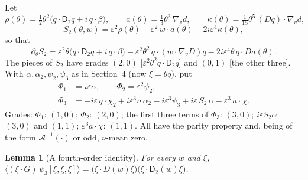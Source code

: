 \documentclass[11pt]{article}
\newcommand{\eps}{\varepsilon}
\newcommand{\cA}{\mathcal{A}}
\newcommand{\sD}{\mathsf{D}}
\newcommand{\avg}[1]{\langle #1\rangle}
\newtheorem{lemma}[theorem]{Lemma}
\theoremstyle{remark}
\begin{document}
Let
\begin{equation}
  \rho(\theta) = \tfrac12\theta^2\bigl(q\cdot\sD_2q + i\,q\cdot\beta\bigr),\qquad
  a(\theta) = \tfrac13\theta^3\,\nabla_vd,\qquad
  \kappa(\theta) = \tfrac1{15}\theta^5\,(Dq)\cdot\nabla_vd,
\end{equation}
\begin{equation}
  S_2(\theta,w) = \eps^2\rho(\theta) - \eps^2\,w\cdot a(\theta) - 2i\eps^4\kappa(\theta),
\end{equation}
so that
\begin{equation}
  \partial_\theta S_2 = \eps^2\theta\bigl(q\cdot\sD_2q + i\,q\cdot\beta\bigr)
    - \eps^2\theta^2\,q\cdot(w\cdot\nabla_vD)q - 2i\eps^4\theta\,q\cdot Da(\theta).
  \label{eq:dS}
\end{equation}
The pieces of $S_2$ have grades $(2,0)$ [$\eps^2\theta^2q\cdot\sD_2q$] and
$(0,1)$ [the other three]. With $\alpha,\alpha_2,\psi_2,\psi_3$ as in
Section~4 (now $\xi=\theta q$), put
\begin{align*}
  \Phi_1 &= i\eps\alpha, \qquad \Phi_2 = \eps^2\psi_2,\\
  \Phi_3 &= -i\eps\,q\cdot\chi_2 + i\eps^3n\,\alpha_2 - i\eps^3\psi_3
     + i\eps\,S_2\,\alpha - \eps^3\,a\cdot\chi .
\end{align*}
Grades: $\Phi_1$: $(1,0)$; $\Phi_2$: $(2,0)$; the first three terms of
$\Phi_3$: $(3,0)$; $i\eps S_2\alpha$: $(3,0)$ and $(1,1)$;
$\eps^3a\cdot\chi$: $(1,1)$. All have the parity property and, being of the
form $\cA^{-1}(\cdot)$ or odd, $\nu$-mean zero.

\begin{lemma}[A fourth-order identity]\label{lem:Q4}
For every $w$ and $\xi$,
$\avg{(\xi\cdot G)\,\psi_3[\xi,\xi,\xi]}
 = \bigl(\xi\cdot D(w)\xi\bigr)\bigl(\xi\cdot\sD_2(w)\xi\bigr)$.
\end{lemma}
\end{document}
